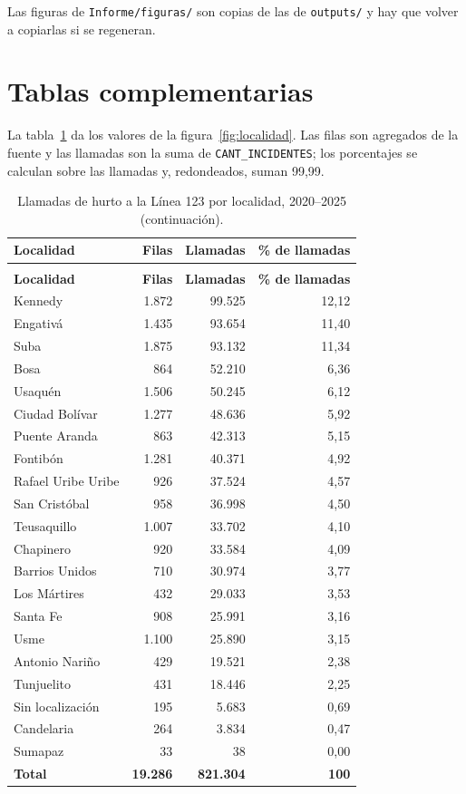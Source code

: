 Las figuras de \texttt{Informe/figuras/} son copias de las de \texttt{outputs/} y hay que volver a copiarlas si se regeneran.

\section{Tablas complementarias}\label{ap:tablas}

La tabla~\ref{tab:localidad-ap} da los valores de la figura~\ref{fig:localidad}. Las filas son agregados de la fuente y las llamadas son la suma de \texttt{CANT\_\allowbreak{}INCIDENTES}; los porcentajes se calculan sobre las llamadas y, redondeados, suman 99,99.

{\small
\begin{longtable}{@{}lrrr@{}}
\caption{Llamadas de hurto a la Línea 123 por localidad, 2020--2025.}\label{tab:localidad-ap}\\
\toprule
\textbf{Localidad} & \textbf{Filas} & \textbf{Llamadas} & \textbf{\% de llamadas} \\
\midrule
\endfirsthead
\caption[]{Llamadas de hurto a la Línea 123 por localidad, 2020--2025 (continuación).}\\
\toprule
\textbf{Localidad} & \textbf{Filas} & \textbf{Llamadas} & \textbf{\% de llamadas} \\
\midrule
\endhead
Kennedy & 1.872 & 99.525 & 12,12 \\
Engativá & 1.435 & 93.654 & 11,40 \\
Suba & 1.875 & 93.132 & 11,34 \\
Bosa & 864 & 52.210 & 6,36 \\
Usaquén & 1.506 & 50.245 & 6,12 \\
Ciudad Bolívar & 1.277 & 48.636 & 5,92 \\
Puente Aranda & 863 & 42.313 & 5,15 \\
Fontibón & 1.281 & 40.371 & 4,92 \\
Rafael Uribe Uribe & 926 & 37.524 & 4,57 \\
San Cristóbal & 958 & 36.998 & 4,50 \\
Teusaquillo & 1.007 & 33.702 & 4,10 \\
Chapinero & 920 & 33.584 & 4,09 \\
Barrios Unidos & 710 & 30.974 & 3,77 \\
Los Mártires & 432 & 29.033 & 3,53 \\
Santa Fe & 908 & 25.991 & 3,16 \\
Usme & 1.100 & 25.890 & 3,15 \\
Antonio Nariño & 429 & 19.521 & 2,38 \\
Tunjuelito & 431 & 18.446 & 2,25 \\
Sin localización & 195 & 5.683 & 0,69 \\
Candelaria & 264 & 3.834 & 0,47 \\
Sumapaz & 33 & 38 & 0,00 \\
\midrule
\textbf{Total} & \textbf{19.286} & \textbf{821.304} & \textbf{100} \\
\bottomrule
\end{longtable}
}

